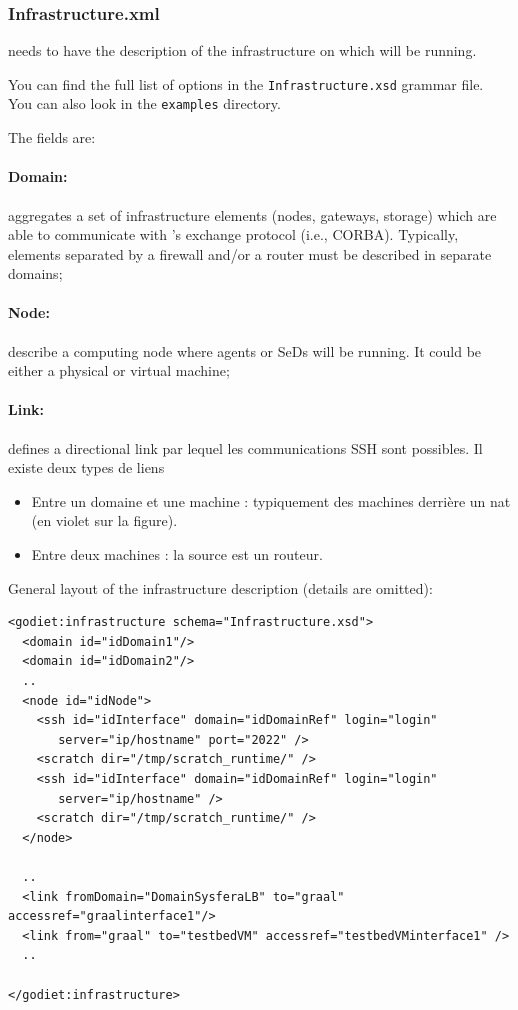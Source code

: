 \subsubsection{Infrastructure.xml}
\label{GODIETInfrastructureDescription}

\godiet needs to have the description of the infrastructure on which \diet will be running. 

\vspace{1cm}
You can find the full list of options in the \verb+Infrastructure.xsd+ grammar file. You can also look in the \verb+examples+ directory.

The fields are:

\paragraph{Domain:} aggregates a set of infrastructure elements (nodes, gateways, storage) which are able to communicate with \diet's exchange protocol (i.e., CORBA). Typically, elements separated by a firewall and/or a router must be described in separate domains;
\paragraph{Node:} describe a computing node where agents or SeDs will be running. It could be either a physical or virtual machine;

\paragraph{Link:} defines a directional link par lequel les communications SSH sont possibles. Il existe deux types de liens
\begin{itemize}
 \item Entre un domaine et une machine : typiquement des machines derrière un nat (en violet sur la figure).
 \item Entre deux machines : la source est un routeur.
\end{itemize}

\vspace{1cm}

General layout of the infrastructure description (details are omitted):
\begin{verbatim}
<godiet:infrastructure schema="Infrastructure.xsd">
  <domain id="idDomain1"/>
  <domain id="idDomain2"/>
  ..
  <node id="idNode">
    <ssh id="idInterface" domain="idDomainRef" login="login" 
       server="ip/hostname" port="2022" />
    <scratch dir="/tmp/scratch_runtime/" />
    <ssh id="idInterface" domain="idDomainRef" login="login"
       server="ip/hostname" />
    <scratch dir="/tmp/scratch_runtime/" />
  </node>

  ..
  <link fromDomain="DomainSysferaLB" to="graal" accessref="graalinterface1"/>
  <link from="graal" to="testbedVM" accessref="testbedVMinterface1" />
  ..

</godiet:infrastructure>
\end{verbatim}


